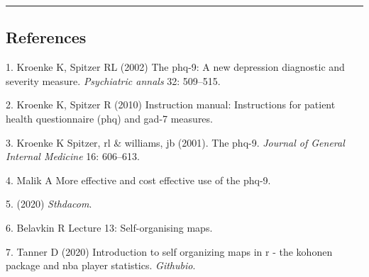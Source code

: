 \documentclass[12pt,]{article}
\begin{document}
\listoftables

\newpage

\begin{center}\rule{0.5\linewidth}{\linethickness}\end{center}

\hypertarget{references}{%
\subsection{References}\label{references}}

\thispagestyle{empty}



\hypertarget{refs}{}
\leavevmode\hypertarget{ref-kroenke2002phq}{}%
1. Kroenke K, Spitzer RL (2002) The phq-9: A new depression diagnostic
and severity measure. \emph{Psychiatric annals} 32: 509--515.

\leavevmode\hypertarget{ref-kroenke2010instruction}{}%
2. Kroenke K, Spitzer R (2010) Instruction manual: Instructions for
patient health questionnaire (phq) and gad-7 measures.

\leavevmode\hypertarget{ref-kroenke16spitzer}{}%
3. Kroenke K Spitzer, rl \& williams, jb (2001). The phq-9.
\emph{Journal of General Internal Medicine} 16: 606--613.

\leavevmode\hypertarget{ref-MalikMoreEf}{}%
4. Malik A More effective and cost effective use of the phq-9.

\leavevmode\hypertarget{ref-STHDA_2020}{}%
5. (2020) \emph{Sthdacom}.

\leavevmode\hypertarget{ref-Belavkin}{}%
6. Belavkin R Lecture 13: Self-organising maps.

\leavevmode\hypertarget{ref-Tanner_2020}{}%
7. Tanner D (2020) Introduction to self organizing maps in r - the
kohonen package and nba player statistics. \emph{Githubio}.
\end{document}
